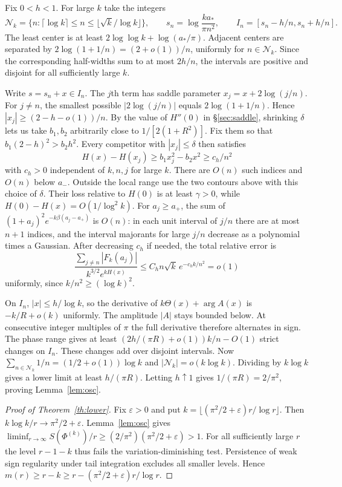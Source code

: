 \documentclass[11pt,a4paper,reqno]{amsart}
\numberwithin{equation}{section}
\begin{document}
Fix \(0<h<1\). For large \(k\) take the integers
\[
 \mathcal N_k=\{n:\lceil\log k\rceil\le n\le\lfloor\sqrt{k}/\log k\rfloor\},
 \qquad s_n=\log\frac{ka_*}{\pi n^2},\qquad I_n=[s_n-h/n,s_n+h/n].
\]
The least center is at least \(2\log\log k+\log(a_*/\pi)\). Adjacent centers are separated by \(2\log(1+1/n)=(2+o(1))/n\), uniformly for \(n\in\mathcal N_k\). Since the corresponding half-widths sum to at most \(2h/n\), the intervals are positive and disjoint for all sufficiently large \(k\).

Write \(s=s_n+x\in I_n\). The \(j\)th term has saddle parameter \(x_j=x+2\log(j/n)\). For \(j\ne n\), the smallest possible \(|2\log(j/n)|\) equals \(2\log(1+1/n)\). Hence \(|x_j|\ge(2-h-o(1))/n\). By the value of \(H''(0)\) in \S\ref{sec:saddle}, shrinking \(\delta\) lets us take \(b_1,b_2\) arbitrarily close to \(1/[2(1+R^2)]\). Fix them so that \(b_1(2-h)^2>b_2h^2\). Every competitor with \(|x_j|\le\delta\) then satisfies
\[
 H(x)-H(x_j)\ge b_1x_j^2-b_2x^2\ge c_h/n^2
\]
with \(c_h>0\) independent of \(k,n,j\) for large \(k\). There are \(O(n)\) such indices and \(O(n)\) below \(a_-\). Outside the local range use the two contours above with this choice of \(\delta\). Their loss relative to \(H(0)\) is at least \(\gamma>0\), while \(H(0)-H(x)=O(1/\log^2 k)\). For \(a_j\ge a_+\), the sum of \((1+a_j)^2e^{-k\beta(a_j-a_+)}\) is \(O(n)\): in each unit interval of \(j/n\) there are at most \(n+1\) indices, and the interval majorants for large \(j/n\) decrease as a polynomial times a Gaussian. After decreasing \(c_h\) if needed, the total relative error is
\[
 \frac{\sum_{j\ne n}|F_k(a_j)|}{k^{3/2}e^{kH(x)}}
 \le C_h n\sqrt{k}\,e^{-c_h k/n^2}=o(1)
\]
uniformly, since \(k/n^2\ge(\log k)^2\).

On \(I_n\), \(|x|\le h/\log k\), so the derivative of \(k\Theta(x)+\arg A(x)\) is \(-k/R+o(k)\) uniformly. The amplitude \(|A|\) stays bounded below. At consecutive integer multiples of \(\pi\) the full derivative therefore alternates in sign. The phase range gives at least \((2h/(\pi R)+o(1))k/n-O(1)\) strict changes on \(I_n\). These changes add over disjoint intervals. Now \(\sum_{n\in\mathcal N_k}1/n=(1/2+o(1))\log k\) and \(|\mathcal N_k|=o(k\log k)\). Dividing by \(k\log k\) gives a lower limit at least \(h/(\pi R)\). Letting \(h\uparrow1\) gives \(1/(\pi R)=2/\pi^2\), proving Lemma~\ref{lem:osc}.

\begin{proof}[Proof of Theorem~\ref{th:lower}]
Fix \(\varepsilon>0\) and put \(k=\lfloor(\pi^2/2+\varepsilon)r/\log r\rfloor\). Then \(k\log k/r\to\pi^2/2+\varepsilon\). Lemma~\ref{lem:osc} gives \(\liminf_{r\to\infty}S(\Phi^{(k)})/r\ge(2/\pi^2)(\pi^2/2+\varepsilon)>1\). For all sufficiently large \(r\) the level \(r-1-k\) thus fails the variation-diminishing test. Persistence of weak sign regularity under tail integration excludes all smaller levels. Hence \(m(r)\ge r-k\ge r-(\pi^2/2+\varepsilon)r/\log r\).
\end{proof}
\end{document}
